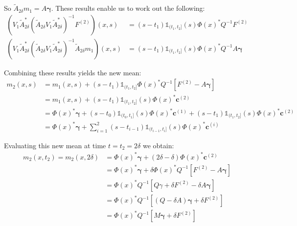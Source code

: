 \documentclass{article}
\theoremstyle{definition}
\theoremstyle{remark}
\theoremstyle{remark}
\begin{document}
So $\tilde{A}_{2\delta}m_1=A\boldsymbol{\gamma}$. These results enable us to work out the following:
\begin{align*}
  (V_{1}\tilde{A}_{2\delta}^{*}(\tilde{A}_{2\delta}V_{1}\tilde{A}_{2\delta}^{*})^{-1}F^{(2)})(x,s) &= (s-t_{1})\mathbb{1}_{(t_1,t_2]}(s)\Phi(x)^{*}Q^{-1}F^{(2)} \\
  (V_{1}\tilde{A}_{2\delta}^{*}(\tilde{A}_{2\delta}V_{1}\tilde{A}_{2\delta}^{*})^{-1}\tilde{A}_{2\delta}m_1)(x,s) &= (s-t_1)\mathbb{1}_{(t_1,t_2]}(s)\Phi(x)^{*}Q^{-1}A\boldsymbol{\gamma}
\end{align*}

\noindent Combining these results yields the new mean:
\begin{align*}
  m_{2}(x,s) &= m_1(x,s)+(s-t_1)\mathbb{1}_{(t_1,t_2]}\Phi(x)^{*}Q^{-1}\left[F^{(2)}-A\boldsymbol{\gamma}\right] \\
  &= m_1(x,s) + (s-t_1)\mathbb{1}_{(t_1,t_2]}(s)\Phi(x)^{*}\boldsymbol{c}^{(2)} \\
  &= \Phi(x)^{*}\boldsymbol{\gamma}+(s-t_0)\mathbb{1}_{(t_0,t_1]}(s)\Phi(x)^{*}\boldsymbol{c}^{(1)} + (s-t_1)\mathbb{1}_{(t_1,t_2]}(s)\Phi(x)^{*}\boldsymbol{c}^{(2)} \\
  &= \Phi(x)^{*}\boldsymbol{\gamma} + \sum_{i=1}^{2}(s-t_{i-1})\mathbb{1}_{(t_{i-1},t_i]}(s)\Phi(x)^{*}\boldsymbol{c}^{(i)}
\end{align*}

\noindent Evaluating this new mean at time $t=t_2=2\delta$ we obtain:
\begin{align*}
  m_2(x,t_2)=m_2(x,2\delta) &= \Phi(x)^{*}\boldsymbol{\gamma} + (2\delta-\delta)\Phi(x)^{*}\boldsymbol{c}^{(2)} \\
  &= \Phi(x)^{*}\boldsymbol{\gamma} + \delta\Phi(x)^{*}Q^{-1}\left[F^{(2)}-A\boldsymbol{\gamma}\right] \\
  &= \Phi(x)^{*}Q^{-1}\left[Q\gamma+\delta F^{(2)}-\delta A\boldsymbol{\gamma}\right] \\
  &= \Phi(x)^{*}Q^{-1}\left[(Q-\delta A)\boldsymbol{\gamma}+\delta F^{(2)}\right] \\
  &= \Phi(x)^{*}Q^{-1}\left[M\boldsymbol{\gamma}+\delta F^{(2)}\right]
\end{align*}
\end{document}
